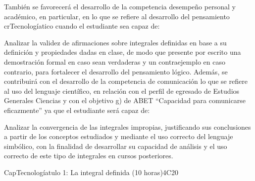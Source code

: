 \begin{syllabus}
\begin{goals}
También se favorecerá el desarrollo de la competencia desempeño personal y académico, en particular, en lo que se refiere al desarrollo del pensamiento crTecnologíatico cuando el estudiante sea capaz de:
\item Analizar la validez de afirmaciones sobre integrales definidas en base a su definición y propiedades dadas en clase, de modo que presente por escrito una demostración formal en caso sean verdaderas y un contraejemplo en caso contrario, para fortalecer el desarrollo del pensamiento lógico.
Además, se contribuirá con el desarrollo de la competencia de comunicación lo que se refiere al uso del lenguaje científico, en relación con el perfil de egresado de Estudios Generales Ciencias y con el objetivo g) de ABET ``Capacidad para comunicarse eficazmente'' ya que el estudiante será capaz de:
\item Analizar la convergencia de las integrales impropias, justificando sus conclusiones a partir de los conceptos estudiados y mediante el uso correcto del lenguaje simbólico, con la finalidad de desarrollar su capacidad de análisis y el uso correcto de este tipo de integrales en cursos posteriores.
\end{goals}

\begin{outcomes}
\item {}
\item {}
\end{outcomes}

\begin{competences}
    \item {}
\end{competences}

\begin{unit}{CapTecnologíatulo 1: La integral definida (10 horas)}{}{}{4}{C20}

% 


\end{unit}
\end{syllabus}
